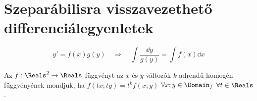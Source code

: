 \clearpage
\section{Szeparábilisra visszavezethető differenciálegyenletek}

\begin{definition}
  $$
    y' = f(x)g(y)
    \quad \Rightarrow \quad
    \int \frac{\dd y}{g(y)} = \int f(x) \dd x
  $$
\end{definition}

\begin{definition}
  Az $f : \Reals^2 \rightarrow \Reals$ függvényt az $x$ és $y$ változók
  $k$-adrendű homogén függvényének mondjuk, ha $f \left( tx; ty \right) = t^k
    f(x; y)$ $\forall x;y \in \Domain_f$ $\forall t \in \Reals$.
\end{definition}